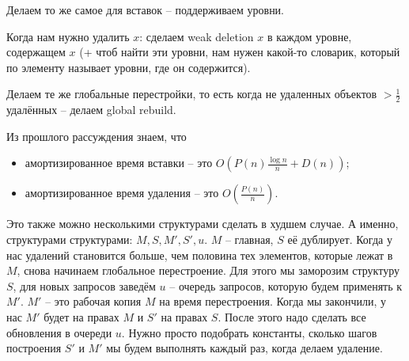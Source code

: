 Делаем то же самое для вставок -- поддерживаем уровни.

Когда нам нужно удалить $x$: сделаем weak deletion $x$ в каждом уровне, содержащем $x$ (+ чтоб найти эти уровни, нам нужен какой-то словарик, который по элементу называет уровни, где он содержится).

Делаем те же глобальные перестройки, то есть когда не удаленных объектов $>\frac{1}{2}$ удалённых -- делаем global rebuild.

Из прошлого рассуждения знаем, что
\begin{itemize}
    \item амортизированное время вставки -- это $O\left(P(n)\frac{\log n}{n}+D(n)\right)$;
    \item амортизированное время удаления -- это $O\left(\frac{P(n)}{n}\right)$.
\end{itemize}

Это также можно несколькими структурами сделать в худшем случае. А именно, структурами структурами: $M,S,M',S',u$. $M$ -- главная, $S$ её дублирует. Когда у нас удалений становится больше, чем половина тех элементов, которые лежат в $M$, снова начинаем глобальное перестроение. Для этого мы заморозим структуру $S$, для новых запросов заведём $ u$ -- очередь запросов, которую будем применять к $M'$. $M'$ -- это рабочая копия $M$ на время перестроения. Когда мы закончили, у нас $M'$ будет на правах $M$ и $S'$ на правах $S$. После этого надо сделать все обновления в очереди $u$. Нужно просто подобрать константы, сколько шагов построения $S'$ и $M'$ мы будем выполнять каждый раз, когда делаем удаление.
